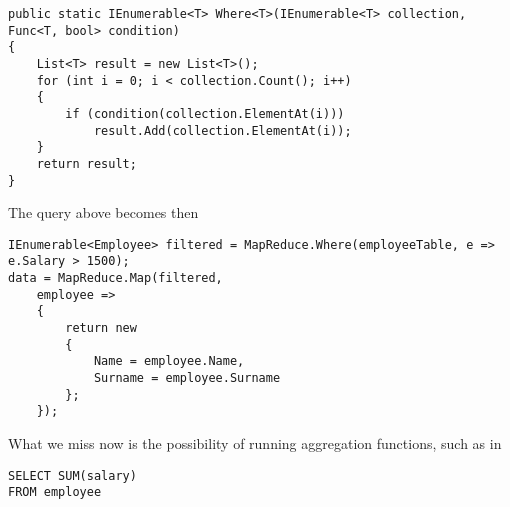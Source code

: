 \begin{lstlisting}
public static IEnumerable<T> Where<T>(IEnumerable<T> collection, 	Func<T, bool> condition)
{
	List<T> result = new List<T>();
	for (int i = 0; i < collection.Count(); i++)
	{
		if (condition(collection.ElementAt(i)))
			result.Add(collection.ElementAt(i));
	}
	return result;
}
\end{lstlisting}

\noindent
The query above becomes then

\begin{lstlisting}
IEnumerable<Employee> filtered = MapReduce.Where(employeeTable, e => e.Salary > 1500);
data = MapReduce.Map(filtered,
	employee =>
	{
		return new
		{
			Name = employee.Name,
			Surname = employee.Surname
		};
	});
\end{lstlisting}

\noindent
What we miss now is the possibility of running aggregation functions, such as in

\begin{lstlisting}
SELECT SUM(salary)
FROM employee
\end{lstlisting}




